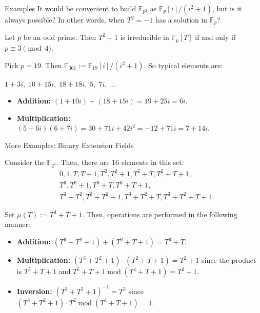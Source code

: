 \documentclass{zkdl-presentation-template}
\begin{document}
    \begin{frame}{Examples}
        It would be convenient to build $\mathbb{F}_{p^2}$ as $\mathbb{F}_p[i]/(i^2+1)$, but is it always possible? In other words, when $T^2=-1$ has a solution in $\mathbb{F}_p$?\pause
        \begin{proposition}
            Let $p$ be an odd prime. Then $T^2+1$ is irreducible in $\mathbb{F}_p[T]$ if and only if $p \equiv 3 \pmod{4}$.\pause
        \end{proposition}

        \begin{example}
            Pick $p=19$. Then $\mathbb{F}_{361} := \mathbb{F}_{19}[i]/(i^2+1)$. So typical elements are:\pause

            $1+3i, \; 10+15i, \; 18+18i, \; 5, \; 7i, \; \dots$

            \begin{itemize}
                \item \textbf{Addition:} $(1+10i)+(18+15i)= 19 + 25i = 6i$.\pause
                \item \textbf{Multiplication:} $(5+6i)(6+7i)=30+71i+42i^2=-12+71i=7+14i$.
            \end{itemize}
        \end{example}
    \end{frame}

    \begin{frame}{More Examples: Binary Extension Fields}
        \begin{example}
            Consider the $\mathbb{F}_{2^4}$. Then, there are $16$ elements in this set:\pause
            \begin{equation*}
                \begin{aligned}
                    &0, 1, T, T+1, T^2, T^2+1, T^2+T, T^2+T+1,\\
                    &T^3, T^3+1, T^3+T, T^3+T+1,\\ &T^3+T^2, T^3+T^2+1, T^3+T^2+T, T^3+T^2+T+1.
                \end{aligned}
            \end{equation*}

            Set $\mu(T):=T^4+T+1$. Then, operations are performed in the following manner:\pause
            \begin{itemize}
                \item \textbf{Addition:} $(T^3+T^2+1)+(T^2+T+1) = T^3+T$.\pause
                \item \textbf{Multiplication:} $(T^3+T^2+1)\cdot(T^2+T+1)=T^2+1$ since the product is $T^5+T+1$ and $T^5+T+1 \; \text{mod} \; (T^4+T+1) = T^2+1$.\pause
                \item \textbf{Inversion:} $(T^3+T^2+1)^{-1}=T^2$ since $(T^3+T^2+1)\cdot T^2 \; \text{mod} \; (T^4+T+1) = 1$.
            \end{itemize}
        \end{example}
    \end{frame}
\end{document}
